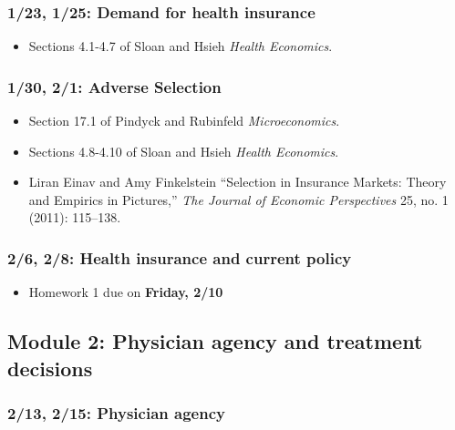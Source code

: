 \documentclass[11pt,]{article}
\providecommand{\tightlist}{%
  \setlength{\itemsep}{0pt}\setlength{\parskip}{0pt}}
\begin{document}
\hypertarget{demand-for-health-insurance}{%
\subsubsection{1/23, 1/25: Demand for health
insurance}\label{demand-for-health-insurance}}

\begin{itemize}
\tightlist
\item
  Sections 4.1-4.7 of Sloan and Hsieh \emph{Health Economics}.
\end{itemize}

\hypertarget{adverse-selection}{%
\subsubsection{1/30, 2/1: Adverse Selection}\label{adverse-selection}}

\begin{itemize}
\tightlist
\item
  Section 17.1 of Pindyck and Rubinfeld \emph{Microeconomics}.
\item
  Sections 4.8-4.10 of Sloan and Hsieh \emph{Health Economics}.
\item
  Liran Einav and Amy Finkelstein {``Selection in {Insurance} {Markets}:
  {Theory} and {Empirics} in {Pictures},''} \emph{The Journal of
  Economic Perspectives} 25, no. 1 (2011): 115--138.
\end{itemize}

\hypertarget{health-insurance-and-current-policy}{%
\subsubsection{2/6, 2/8: Health insurance and current
policy}\label{health-insurance-and-current-policy}}

\begin{itemize}
\tightlist
\item
  Homework 1 due on \textbf{Friday, 2/10}
\end{itemize}

\hypertarget{module-2-physician-agency-and-treatment-decisions}{%
\subsection{Module 2: Physician agency and treatment
decisions}\label{module-2-physician-agency-and-treatment-decisions}}

\hypertarget{physician-agency}{%
\subsubsection{2/13, 2/15: Physician agency}\label{physician-agency}}
\end{document}
